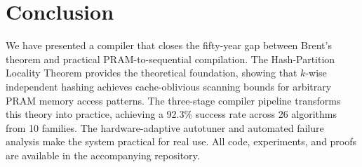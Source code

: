 \documentclass[11pt]{article}
\begin{document}
\section{Conclusion}
\label{sec:conclusion}

We have presented a compiler that closes the fifty-year gap between
Brent's theorem and practical PRAM-to-sequential compilation.  The
Hash-Partition Locality Theorem provides the theoretical foundation,
showing that $k$-wise independent hashing achieves cache-oblivious
scanning bounds for arbitrary PRAM memory access patterns.  The
three-stage compiler pipeline transforms this theory into practice,
achieving a 92.3\% success rate across 26 algorithms from 10 families.
The hardware-adaptive autotuner and automated failure analysis make the
system practical for real use.  All code, experiments, and proofs are
available in the accompanying repository.
\end{document}
